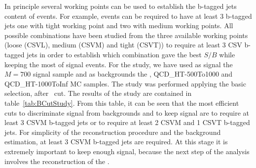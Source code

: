 In principle several working points can be used to establish the b-tagged jets content of events. For example, events can be required to have at least 3 b-tagged jets one with tight working point and two with medium working points. All possible combinations have been studied from the three available working points (loose (CSVL), medium (CSVM) and tight (CSVT)) to require at least 3 CSV b-tagged jets in order to establish which combination gave the best $S/B$ while keeping the most of signal events. For the study, we have used as signal the $M=700$ \GeVcc signal sample and as backgrounds the \ttbar, QCD\_HT-500To1000 and QCD\_HT-1000ToInf MC samples. The study was performed applying the basic selection, after \HT~cut. The results of the study are contained in table~\ref{tab:BCutStudy}. From this table, it can be seen that the most efficient cuts to discriminate signal from backgrounds and to keep signal are to require at least 3 CSVM b-tagged jets or to require at least 2 CSVM and 1 CSVT b-tagged jets. For simplicity of the reconstruction procedure and the background estimation, at least 3 CSVM b-tagged jets are required. At this stage it is extremely important to keep enough signal, because the next step of the analysis involves the reconstruction of the \Tp.

